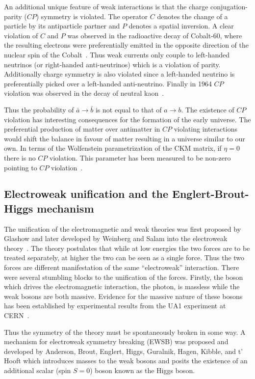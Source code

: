 An additional unique feature of weak interactions is that the charge conjugation-parity ($CP$) symmetry is violated. The operator $C$ denotes the change of a particle by its antiparticle partner and $P$ denotes a spatial inversion. A clear violation of $C$ and $P$ was observed in the radioactive decay of Cobalt-60, where the resulting electrons were preferentially emitted in the opposite direction of the nuclear spin of the Cobalt~\cite{Experimentalb}. Thus weak currents only couple to left-handed neutrinos (or right-handed anti-neutrinos) which is a violation of parity. Additionally charge symmetry is also violated since a left-handed neutrino is preferentially picked over a left-handed anti-neutrino. Finally in 1964 $CP$ violation was observed in the decay of neutral kaon~\cite{Evidence}.

Thus the probability of $\bar{a}\rightarrow \bar{b}$ is not equal to that of $a\rightarrow b$. The existence of $CP$ violation has interesting consequences for the formation of the early universe. The preferential production of matter over antimatter in $CP$ violating interactions would shift the balance in favour of matter resulting in a universe similar to our own. In terms of the Wolfenstein parametrization of the CKM matrix, if $\eta=0$ there is no $CP$ violation. This parameter has been measured to be non-zero pointing to $CP$ violation~\cite{Theory:PDGBooklet}.

\subsection{Electroweak unification and the Englert-Brout-Higgs mechanism}

The unification of the electromagnetic and weak theories was first proposed by Glashow and later developed by Weinberg and Salam into the electroweak theory~\cite{Model,Theory:WeakInteractionsGlashow,Theory:WeakEMInteractions}. The theory postulates that while at low energies the two forces are to be treated separately, at higher the two can be seen as a single force. Thus the two forces are different manifestation of the same ``electroweak'' interaction. There were several stumbling blocks to the unification of the forces. Firstly, the boson which drives the electromagnetic interaction, the photon, is massless while the weak bosons are both massive. Evidence for the massive nature of these bosons has been established by experimental results from the UA1 experiment at CERN~\cite{Theory:WBosonObservationPaper}.

Thus the symmetry of the theory must be spontaneously broken in some way. A mechanism for electroweak symmetry breaking (EWSB) was proposed and developed by Anderson, Brout, Englert, Higgs, Guralnik, Hagen, Kibble, and t' Hooft which introduces masses to the weak bosons and posits the existence of an additional scalar (spin $S=0$) boson known as the Higgs boson.

